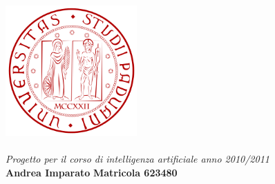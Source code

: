 
\begin{titlepage} %

\begin{center}


	 \includegraphics[height=5cm]{logo_unipd.png}\\[1cm]
	    \huge \textbf{\the\titolo}\\[7cm]


	\large \emph{Progetto per il corso di intelligenza artificiale anno 2010/2011}\\[1cm]
	\normalsize \textbf{Andrea Imparato} %
	\normalsize \textbf{Matricola 623480}


\end{center}
\end{titlepage}

